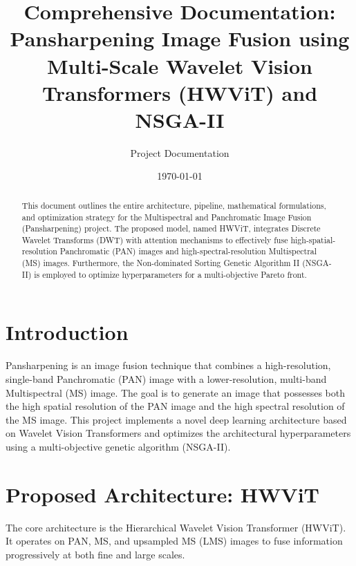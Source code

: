 \documentclass[11pt]{article}
\title{Comprehensive Documentation: Pansharpening Image Fusion using Multi-Scale Wavelet Vision Transformers (HWViT) and NSGA-II}
\author{Project Documentation}
\date{\today}
\begin{document}
\maketitle

\begin{abstract}
This document outlines the entire architecture, pipeline, mathematical formulations, and optimization strategy for the Multispectral and Panchromatic Image Fusion (Pansharpening) project. The proposed model, named HWViT, integrates Discrete Wavelet Transforms (DWT) with attention mechanisms to effectively fuse high-spatial-resolution Panchromatic (PAN) images and high-spectral-resolution Multispectral (MS) images. Furthermore, the Non-dominated Sorting Genetic Algorithm II (NSGA-II) is employed to optimize hyperparameters for a multi-objective Pareto front.
\end{abstract}

\tableofcontents

\section{Introduction}
Pansharpening is an image fusion technique that combines a high-resolution, single-band Panchromatic (PAN) image with a lower-resolution, multi-band Multispectral (MS) image. The goal is to generate an image that possesses both the high spatial resolution of the PAN image and the high spectral resolution of the MS image. This project implements a novel deep learning architecture based on Wavelet Vision Transformers and optimizes the architectural hyperparameters using a multi-objective genetic algorithm (NSGA-II).

\section{Proposed Architecture: HWViT}
The core architecture is the Hierarchical Wavelet Vision Transformer (HWViT). It operates on PAN, MS, and upsampled MS (LMS) images to fuse information progressively at both fine and large scales.
\end{document}
